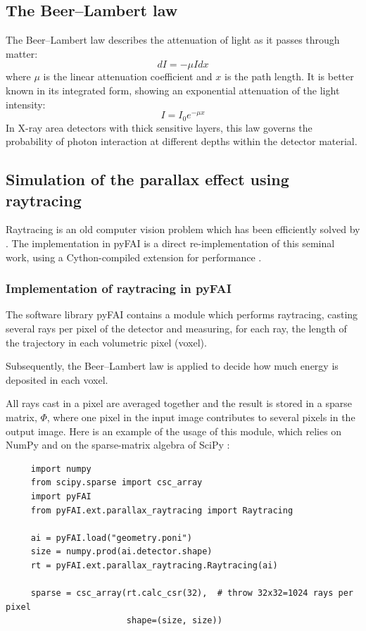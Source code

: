 \documentclass[preprint,pdf]{iucr}              %
\begin{document}
     \subsection{The Beer--Lambert law}
The Beer--Lambert law describes the attenuation of light as it passes through matter:
\begin{equation}
\label{eq:beer-lambert}
dI = -\mu I dx
\end{equation}
where $\mu$ is the linear attenuation coefficient and $x$ is the path length.
It is better known in its integrated form, showing an exponential attenuation of the light intensity:
\begin{equation}
\label{eq:beer-lambert-integrated}
I = I_0 e^{-\mu x}
\end{equation}
In X-ray area detectors with thick sensitive layers, this law governs the probability of photon
interaction at different depths within the detector material.
     \subsection{Simulation of the parallax effect using raytracing}
Raytracing is an old computer vision problem which has been efficiently solved by .
The implementation in pyFAI is a direct re-implementation of this seminal work, using a Cython-compiled extension for performance \cite{cython}.
          \subsubsection{Implementation of raytracing in pyFAI}
          \label{sec:raytracing}
The software library pyFAI contains a module which performs raytracing, casting
several rays per pixel of the detector and measuring, for each ray, the length of the
trajectory in each volumetric pixel (voxel).

Subsequently, the Beer--Lambert law is applied to decide how much energy is deposited in
each voxel.

All rays cast in a pixel are averaged together and the result is stored in a sparse matrix, $\Phi$,
where one pixel in the input image contributes to several pixels in the output image.
Here is an example of the usage of this module, which relies on NumPy \cite{numpy}
and on the sparse-matrix algebra of SciPy \cite{scipy}:
\begin{verbatim}
     import numpy
     from scipy.sparse import csc_array
     import pyFAI
     from pyFAI.ext.parallax_raytracing import Raytracing

     ai = pyFAI.load("geometry.poni")
     size = numpy.prod(ai.detector.shape)
     rt = pyFAI.ext.parallax_raytracing.Raytracing(ai)

     sparse = csc_array(rt.calc_csr(32),  # throw 32x32=1024 rays per pixel
                        shape=(size, size))
\end{verbatim}
\end{document}
